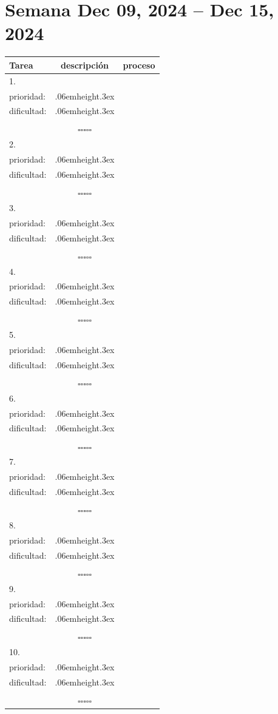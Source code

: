 \documentclass[a4paper,12pt, tikz]{scrartcl}
\newcommand\Vtextvisiblespace[1][.3em]{%
  \mbox{\kern.06em\vrule height.3ex}%
  \vbox{\hrule width#1}%
  \hbox{\vrule height.3ex}}
\newcommand{\subtablaDescrip}{ \begin{tabular}{ll}&\\ prioridad: & \Vtextvisiblespace[2em] \\ dificultad: & \Vtextvisiblespace[2em]\\&\\ \end{tabular}}
\begin{document}
\section*{Semana Dec 09, 2024 -- Dec 15, 2024}
\thispagestyle{empty}
\noindent
\begin{tabularx}{\linewidth}{|X|c c|}
    \hline
  \textbf{Tarea} & \textbf{descripción} & \textbf{proceso}\\
  \hline
   1.\vspace{4ex} &      \subtablaDescrip     & $\square\square\square\square\square$ \\
  \hline
  2.\vspace{4ex} &      \subtablaDescrip     & $\square\square\square\square\square$ \\
  \hline
  3.\vspace{4ex} &      \subtablaDescrip     & $\square\square\square\square\square$ \\
  \hline
  4.\vspace{4ex} &      \subtablaDescrip     & $\square\square\square\square\square$ \\
  \hline
  5.\vspace{4ex} &      \subtablaDescrip     & $\square\square\square\square\square$ \\
  \hline
  6.\vspace{4ex} &      \subtablaDescrip     & $\square\square\square\square\square$ \\
  \hline
  7.\vspace{4ex} &      \subtablaDescrip     & $\square\square\square\square\square$ \\
  \hline
  8.\vspace{4ex} &      \subtablaDescrip     & $\square\square\square\square\square$ \\
  \hline
  9.\vspace{4ex} &      \subtablaDescrip     & $\square\square\square\square\square$ \\
  \hline
  10.\vspace{4ex} &      \subtablaDescrip     & $\square\square\square\square\square$ \\
  \hline
\end{tabularx}

\newpage
\end{document}
